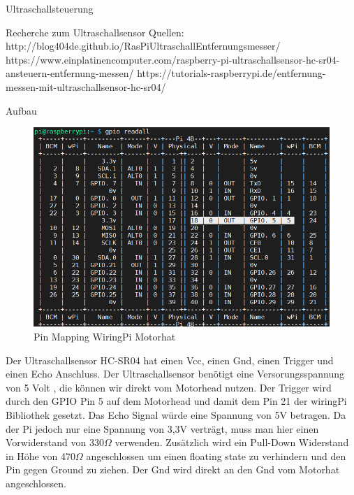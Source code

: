 \documentclass[12pt,twoside]{report}
\begin{document}
\begin{section}{Ultraschallsteuerung}
    \begin{subsection}{Recherche zum Ultraschallsensor}
        Quellen:
        http://blog404de.github.io/RasPiUltraschallEntfernungsmesser/
        https://www.einplatinencomputer.com/raspberry-pi-ultraschallsensor-hc-sr04-ansteuern-entfernung-messen/
        https://tutorials-raspberrypi.de/entfernung-messen-mit-ultraschallsensor-hc-sr04/
    \end{subsection}
    \begin{subsection}{Aufbau}
        \begin{figure}[h!]
              \includegraphics[width=\linewidth]{lernportfolio_assets/GPIO_Pins}
              \caption{Pin Mapping WiringPi Motorhat}
              \label{fig:boat1}
        \end{figure}
        Der Ultraschallsensor HC-SR04 hat einen Vcc, einen Gnd, einen Trigger und einen Echo Anschluss.
        Der Ultraschallsensor benötigt eine Versorungsspannung von 5 Volt , die können wir direkt vom Motorhead nutzen.
        Der Trigger wird durch den GPIO Pin 5 auf dem Motorhead und damit dem Pin 21 der wiringPi Bibliothek gesetzt.
        Das Echo Signal würde eine Spannung von 5V betragen. Da der Pi jedoch nur eine Spannung von 3,3V verträgt, muss man hier einen Vorwiderstand von 330$\Omega$ verwenden. Zusätzlich wird ein Pull-Down Widerstand in Höhe von 470$\Omega$ angeschlossen um einen floating state zu verhindern und den Pin gegen Ground zu ziehen.
        Der Gnd wird direkt an den Gnd vom Motorhat angeschlossen.


\end{subsection}
\end{section}
\end{document}
